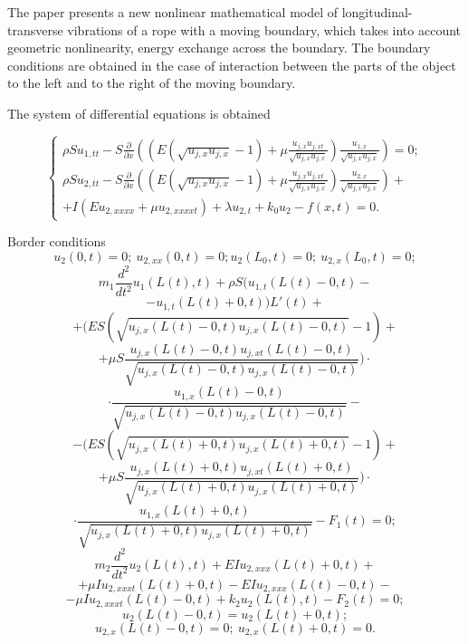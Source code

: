 The paper presents a new nonlinear mathematical model of longitudinal-transverse vibrations of a rope with a moving boundary, which takes into account geometric nonlinearity, energy exchange across the boundary. The boundary conditions are obtained in the case of interaction between the parts of the object to the left and to the right of the moving boundary.

The system of differential equations is obtained

\begin{equation*}
    \begin{cases}
        \rho Su_{1,tt}\! - \!S\frac{\partial }{\partial x} \left(\left(\!E\left(\sqrt{u_{j,x} u_{j,x} }\! - \!1\right) \! + \! \mu \frac{u_{j,x} u_{j,xt} }{\sqrt{u_{j,x} u_{j,x} } } \right)\frac{u_{1,x} }{\sqrt{u_{j,x} u_{j,x} } } \right)\! = \! 0; \\
        \rho Su_{2,tt}\! - \!S\frac{\partial }{\partial x} \left(\left(\!E\left(\sqrt{u_{j,x} u_{j,x} }\! - \!1\right) \! + \! \mu \frac{u_{j,x} u_{j,xt} }{\sqrt{u_{j,x} u_{j,x} } } \right)\frac{u_{2,x} }{\sqrt{u_{j,x} u_{j,x} } } \right)+ \\
        +I\left(Eu_{2,xxxx} +\mu u_{2,xxxxt} \right)+\lambda u_{2,t} +k_{0} u_{2} -f(x,t)=0.
    \end{cases}
\end{equation*}


Border conditions
$$u_{2} (0,t)=0; \ u_{2,xx} (0,t)=0;   u_{2} (L_{0} ,t)=0; \ u_{2,x} (L_{0} ,t)=0;$$
$$m_{1} \frac{d^{2} }{dt^{2} } u_{1} \left(L(t),t\right)+\rho S\bigg(u_{1,t} \left(L(t)-0,t\right)-$$
$$-u_{1,t} \left(L(t)+0,t\right)\bigg)L'(t)+$$
$$+\bigg(ES\left(\sqrt{u_{j,x} \left(L(t)-0,t\right)u_{j,x} \left(L(t)-0,t\right)} -1\right)+$$
$$+\mu S\frac{u_{j,x} \left(L(t)-0,t\right)u_{j,xt} \left(L(t)-0,t\right)}{\sqrt{u_{j,x} \left(L(t)-0,t\right)u_{j,x} \left(L(t)-0,t\right)}} \bigg)\cdot$$
$$\cdot\frac{u_{1,x} \left(L(t)-0,t\right)}{\sqrt{u_{j,x} \left(L(t)-0,t\right)u_{j,x} \left(L(t)-0,t\right)} } -$$
$$-\bigg(ES\left(\sqrt{u_{j,x} \left(L(t)+0,t\right)u_{j,x} \left(L(t)+0,t\right)} -1\right) +$$
$$+\mu S\frac{u_{j,x} \left(L(t)+0,t\right)u_{j,xt} \left(L(t)+0,t\right)}{\sqrt{u_{j,x}\left(L(t)+0,t\right)u_{j,x} \left(L(t)+0,t\right)} } \bigg)\cdot$$
$$\cdot\frac{u_{1,x} \left(L(t)+0,t\right)}{\sqrt{u_{j,x} \left(L(t)+0,t\right)u_{j,x} \left(L(t)+0,t\right)} } -F_{1} (t)=0;$$
$$m_{2} \frac{d^{2} }{dt^{2} } u_{2} \left(L(t),t\right)+EIu_{2,xxx} \left(L(t)+0,t\right)+$$
$$+\mu Iu_{2,xxxt} \left(L(t)+0,t\right)-EIu_{2,xxx} \left(L(t)-0,t\right)-$$
$$-\mu Iu_{2,xxxt} \left(L(t)-0,t\right)+k_{2} u_{2} \left(L(t),t\right)-F_{2} (t)=0;$$
$$u_{2} \left(L(t)-0,t\right)=u_{2} \left(L(t)+0,t\right);$$
$$u_{2,x} \left(L(t)-0,t\right)=0; \ u_{2,x} \left(L(t)+0,t\right)=0.$$

